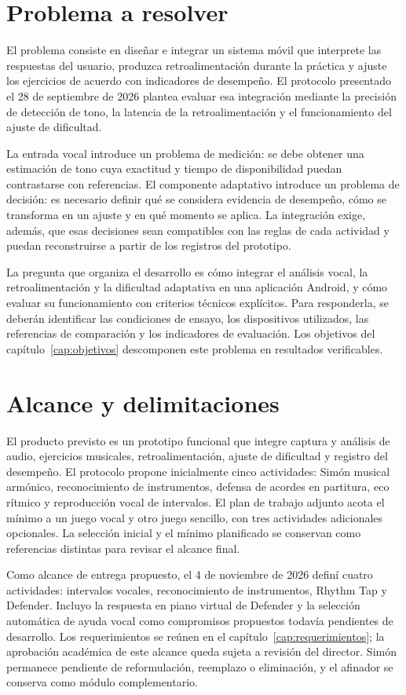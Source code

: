\section{Problema a resolver}
El problema consiste en diseñar e integrar un sistema móvil que interprete las respuestas
del usuario, produzca retroalimentación durante la práctica y ajuste los ejercicios
de acuerdo con indicadores de desempeño. El protocolo presentado el 28 de septiembre
de 2026 plantea evaluar esa integración mediante la precisión de detección de tono,
la latencia de la retroalimentación y el funcionamiento del ajuste de dificultad.

La entrada vocal introduce un problema de medición: se debe obtener una estimación de
tono cuya exactitud y tiempo de disponibilidad puedan contrastarse con referencias.
El componente adaptativo introduce un problema de decisión: es necesario definir qué
se considera evidencia de desempeño, cómo se transforma en un ajuste y en qué momento
se aplica. La integración exige, además, que esas decisiones sean compatibles con las
reglas de cada actividad y puedan reconstruirse a partir de los registros del prototipo.

La pregunta que organiza el desarrollo es cómo integrar el análisis vocal, la
retroalimentación y la dificultad adaptativa en una aplicación Android, y cómo evaluar
su funcionamiento con criterios técnicos explícitos. Para responderla, se deberán
identificar las condiciones de ensayo, los dispositivos utilizados, las referencias de
comparación y los indicadores de evaluación. Los objetivos del
capítulo~\ref{cap:objetivos} descomponen este problema en resultados verificables.
\section{Alcance y delimitaciones}
El producto previsto es un prototipo funcional que integre captura y análisis de audio,
ejercicios musicales, retroalimentación, ajuste de dificultad y registro del desempeño.
El protocolo propone inicialmente cinco actividades: Simón musical armónico,
reconocimiento de instrumentos, defensa de acordes en partitura, eco rítmico y reproducción
vocal de intervalos. El plan de trabajo adjunto acota el mínimo a un juego vocal y otro
juego sencillo, con tres actividades adicionales opcionales. La selección inicial y el
mínimo planificado se conservan como referencias distintas para revisar el alcance final.

Como alcance de entrega propuesto, el 4 de noviembre de 2026 definí cuatro
actividades: intervalos vocales, reconocimiento de instrumentos, Rhythm Tap y
Defender. Incluyo la respuesta en piano virtual de Defender y la selección
automática de ayuda vocal como compromisos propuestos todavía pendientes de
desarrollo. Los requerimientos se reúnen en el capítulo~\ref{cap:requerimientos};
la aprobación académica de este alcance queda sujeta a revisión del director.
Simón permanece pendiente de reformulación, reemplazo o eliminación, y el
afinador se conserva como módulo complementario.

